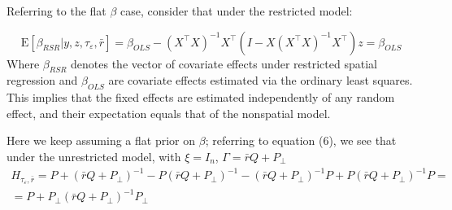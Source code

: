 \documentclass[openany]{book}
\begin{document}

Referring to the flat $\beta$ case, consider that under the restricted model:

$$
\mathrm{E}[\beta_{RSR} | y, z, \tau_{\varepsilon}, \bar{r}] = \beta_{OLS} - (X^{\top}X)^{-1} X^{\top}(I - X(X^{\top}X)^{-1}X^{\top})z = \beta_{OLS}
$$
Where $\beta_{RSR}$ denotes the vector of covariate effects under restricted spatial regression and $\beta_{OLS}$ are covariate effects estimated via the ordinary least squares.
This implies that the fixed effects are estimated independently of any random effect, and their expectation equals that of the nonspatial model.


Here we keep assuming a flat prior on $\beta$; referring to equation (6), we see that under the  unrestricted model, with $\xi = I_n$, $\Gamma = \bar{r} Q + P_{\bot}$
\begin{align*}
H_{\tau_{\varepsilon}, \bar{r}} = P + (\bar{r} Q + P_{\bot})^{-1} - P (\bar{r} Q + P_{\bot})^{-1} - (\bar{r} Q + P_{\bot})^{-1} P + P (\bar{r} Q + P_{\bot})^{-1}P = \\
= P + P_{\bot} (\bar{r} Q + P_{\bot})^{-1} P_{\bot}
\end{align*}
\end{document}
